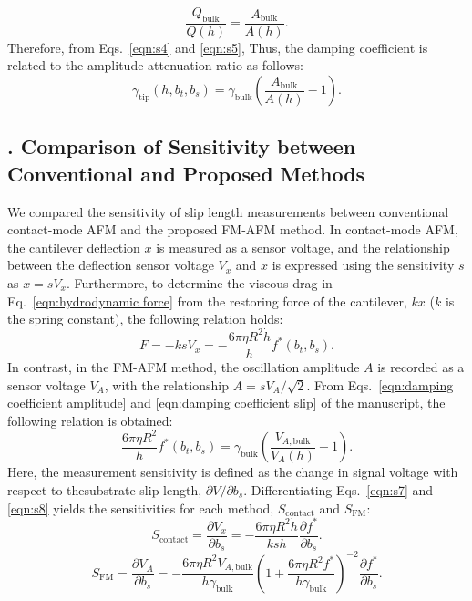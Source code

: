 \documentclass[journal=jacsat,manuscript=article]{achemso}
\newcounter{supppart}
\renewcommand{\thesupppart}{\Roman{supppart}}
\newcommand{\subsectionpart}[2]{%
  \refstepcounter{supppart}%
  \subsection{\thesupppart. #2}%
  \label{supppart:#1}%
}
\begin{document}
\begin{equation}
  \frac{Q_{\text{bulk}}}{Q(h)} = \frac{A_{\text{bulk}}}{A(h)}.
  \tag{S5}
  \label{eqn:s5}
\end{equation}
Therefore, from Eqs.~\ref{eqn:s4} and \ref{eqn:s5}, Thus, the damping coefficient is related to the amplitude attenuation ratio as follows:
\begin{equation}
  \gamma_{\text{tip}}(h, b_t, b_s) = \gamma_{\text{bulk}}\left(\frac{A_{\text{bulk}}}{A(h)} - 1\right).
  \tag{S6}
  \label{eqn:s6}
\end{equation}
\subsectionpart{sensitivity-comparison}{Comparison of Sensitivity between Conventional and Proposed Methods}

We compared the sensitivity of slip length measurements between conventional contact-mode AFM and the proposed FM-AFM method. In contact-mode AFM, the cantilever deflection \(x\) is measured as a sensor voltage, and the relationship between the deflection sensor voltage \(V_x\) and \(x\) is expressed using the sensitivity \(s\) as \(x = sV_x\). Furthermore, to determine the viscous drag in Eq.~\ref{eqn:hydrodynamic force} from the restoring force of the cantilever, \(kx\) (\(k\) is the spring constant), the following relation holds:
\begin{equation}
  F = -ksV_x = -\frac{6\pi\eta R^2 \dot{h}}{h} f^{*}(b_t, b_s).
  \tag{S7}
  \label{eqn:s7}
\end{equation}
In contrast, in the FM-AFM method, the oscillation amplitude \(A\) is recorded as a sensor voltage \(V_A\), with the relationship \(A = sV_A/\sqrt{2}\). From Eqs.~\ref{eqn:damping coefficient amplitude} and \ref{eqn:damping coefficient slip} of the manuscript, the following relation is obtained:
\begin{equation}
  \frac{6\pi\eta R^2}{h} f^{*}(b_t, b_s) = \gamma_{\text{bulk}}\left(\frac{V_{A,\text{bulk}}}{V_A(h)} - 1\right).
  \tag{S8}
  \label{eqn:s8}
\end{equation}
Here, the measurement sensitivity is defined as the change in signal voltage with respect to thesubstrate slip length, \(\partial V/\partial b_s\). Differentiating Eqs.~\ref{eqn:s7} and \ref{eqn:s8} yields the sensitivities for each method, \(S_{\text{contact}}\) and \(S_{\text{FM}}\):
\begin{equation}
  S_{\text{contact}} = \frac{\partial V_x}{\partial b_s} = -\frac{6\pi\eta R^2 \dot{h}}{k s h}\frac{\partial f^{*}}{\partial b_s}.
  \tag{S9}
  \label{eqn:s9}
\end{equation}
\begin{equation}
  S_{\text{FM}} = \frac{\partial V_A}{\partial b_s} = -\frac{6\pi\eta R^2 V_{A,\text{bulk}}}{h\gamma_{\text{bulk}}}\left(1 + \frac{6\pi\eta R^2 f^{*}}{h\gamma_{\text{bulk}}}\right)^{-2}\frac{\partial f^{*}}{\partial b_s}.
  \tag{S10}
  \label{eqn:s10}
\end{equation}
\end{document}
